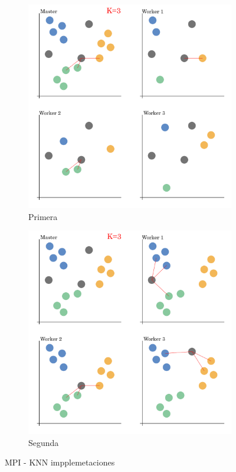 		\begin{figure}[!h]
			\centering
			
			
			\begin{subfigure}[t]{0.45\textwidth}
				\centering
				\includegraphics[width=\textwidth]{images/chapter_3/knn_mpi1}
				\caption{Primera}
				\label{fig:knn1}
			\end{subfigure}
			\hfill
			\begin{subfigure}[t]{0.45\textwidth}
				\centering
				\includegraphics[width=\textwidth]{images/chapter_3/knn_mpi2}
				\caption{Segunda}
				\label{fig:knn2}
			\end{subfigure}
			
			\caption{MPI - KNN impplemetaciones}
			\label{fig:knnmpi}
		\end{figure}

